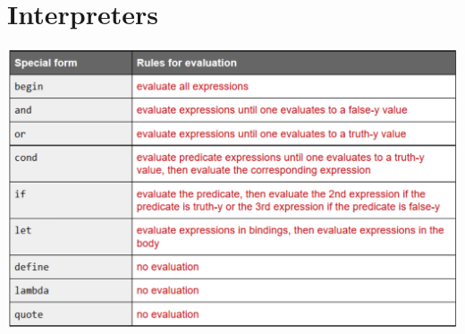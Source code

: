 \documentclass{exam}
\begin{document}
\section{Interpreters}
\begin{center}
 \includegraphics[scale=0.6]{evalRules}
\end{center}
\end{document}
